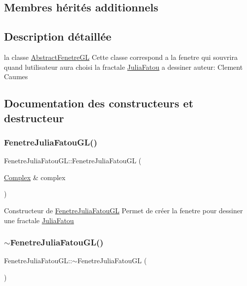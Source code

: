 \subsection*{Membres hérités additionnels}


\subsection{Description détaillée}
la classe \hyperlink{classAbstractFenetreGL}{Abstract\+Fenetre\+GL} Cette classe correspond a la fenetre qui s\textquotesingle{}ouvrira quand l\textquotesingle{}utilisateur aura choisi la fractale \hyperlink{classJuliaFatou}{Julia\+Fatou} a dessiner auteur\+: Clement Caumes 

\subsection{Documentation des constructeurs et destructeur}
\mbox{\label{classFenetreJuliaFatouGL_a81cadd784a4ce06c47e7e4223f3c55d5}} 
\subsubsection{\texorpdfstring{Fenetre\+Julia\+Fatou\+G\+L()}{FenetreJuliaFatouGL()}}
{\footnotesize\ttfamily Fenetre\+Julia\+Fatou\+G\+L\+::\+Fenetre\+Julia\+Fatou\+GL (\begin{DoxyParamCaption}\item[{\hyperlink{classComplex}{Complex} \&}]{complex }\end{DoxyParamCaption})}

Constructeur de \hyperlink{classFenetreJuliaFatouGL}{Fenetre\+Julia\+Fatou\+GL} Permet de créer la fenetre pour dessiner une fractale \hyperlink{classJuliaFatou}{Julia\+Fatou} \mbox{\label{classFenetreJuliaFatouGL_a2d321f007990c90f48e87d6fb1dc7eda}} 
\subsubsection{\texorpdfstring{$\sim$\+Fenetre\+Julia\+Fatou\+G\+L()}{~FenetreJuliaFatouGL()}}
{\footnotesize\ttfamily Fenetre\+Julia\+Fatou\+G\+L\+::$\sim$\+Fenetre\+Julia\+Fatou\+GL (\begin{DoxyParamCaption}{ }\end{DoxyParamCaption})}

